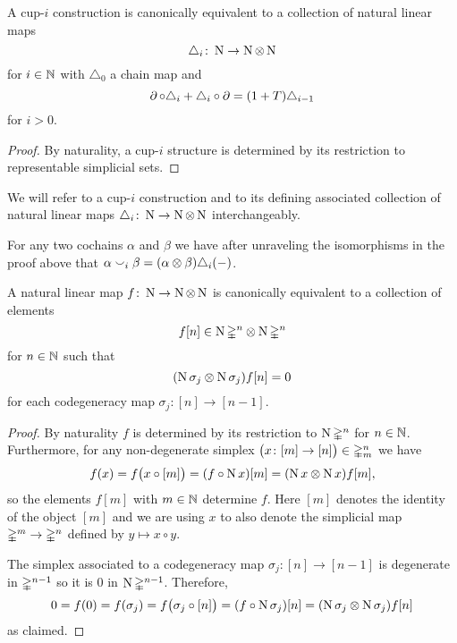 \begin{lemma} \label{l:cup-i construction coalgebra}
	A cup-$i$ construction is canonically equivalent to a collection of natural linear maps
	\[
	\triangle_i \colon \operatorname{N} \to \operatorname{N} \otimes \operatorname{N}
	\]
	for $i \in \mathbb{N}$ with $\triangle_0$ a chain map and
	\[
	\operatorname{\partial} \circ \triangle_i + \triangle_i \circ \operatorname{\partial} =
	(1+T) \triangle_{i-1}
	\]
	for $i > 0$.
\end{lemma}

\begin{proof}
	By naturality, a cup-$i$ structure is determined by its restriction to representable simplicial sets.
\end{proof}

We will refer to a cup-$i$ construction and to its defining associated collection of natural linear maps $\triangle_i \colon \operatorname{N} \to \operatorname{N} \otimes \operatorname{N}$ interchangeably.

\begin{remark}
	For any two cochains $\alpha$ and $\beta$ we have after unraveling the isomorphisms in the proof above that $\alpha \smallsmile_i \beta = (\alpha \otimes \beta) \triangle_i(-)$.
\end{remark}

\begin{lemma} \label{l:natural linear map}
	A natural linear map $f \colon \operatorname{N} \to \operatorname{N} \otimes \operatorname{N}$ is canonically equivalent to a collection of elements
	\[
	f[n] \in \operatorname{N} \mathbb{\Delta}^n \otimes \operatorname{N} \mathbb{\Delta}^n
	\]
	for $n \in \mathbb{N}$ such that
	\[
	(\operatorname{N} \sigma_j \otimes \operatorname{N} \sigma_j) f[n] = 0
	\]
	for each codegeneracy map $\sigma_j \colon [n] \to [n-1]$.
\end{lemma}

\begin{proof}
	By naturality $f$ is determined by its restriction to $\operatorname{N} \mathbb{\Delta}^n$ for $n \in \mathbb{N}$.
	Furthermore, for any non-degenerate simplex $\big( x \colon [m] \to [n] \big) \in \mathbb{\Delta}^n_m$ we have
	\[
	f(x) = f \big( x \circ [m] \big) =
	(f \circ \operatorname{N} x) [m] =
	(\operatorname{N} x \otimes \operatorname{N} x) f [m],
	\]
	so the elements $f[m]$ with $m \in \mathbb{N}$ determine $f$.
	Here $[m]$ denotes the identity of the object $[m]$ and we are using $x$ to also denote the simplicial map $\mathbb{\Delta}^m \to \mathbb{\Delta}^n$ defined by $y \mapsto x \circ y$.

	The simplex associated to a codegeneracy map $\sigma_j \colon [n] \to [n-1]$ is degenerate in $\mathbb{\Delta}^{n-1}$ so it is $0$ in $\operatorname{N} \mathbb{\Delta}^{n-1}$.
	Therefore,
	\[
	0 = f(0) = f(\sigma_j) =
	f \big( \sigma_j \circ [n] \big) =
	(f \circ \operatorname{N} \sigma_j) [n] =
	(\operatorname{N} \sigma_j \otimes \operatorname{N} \sigma_j) f [n]
	\]
	as claimed.
\end{proof}

